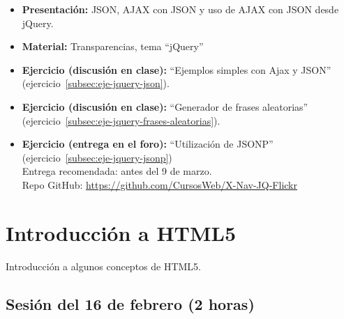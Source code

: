 \documentclass[a4paper,12pt]{report}
\begin{document}
\begin{itemize}
\item \textbf{Presentación:} JSON, AJAX con JSON y uso de AJAX con JSON desde jQuery.
\item \textbf{Material:} Transparencias, tema ``jQuery''
\item \textbf{Ejercicio (discusión en clase):} ``Ejemplos simples con Ajax y JSON'' (ejercicio~\ref{subsec:eje-jquery-json}).
\item \textbf{Ejercicio (discusión en clase):} ``Generador de frases aleatorias'' (ejercicio~\ref{subsec:eje-jquery-frases-aleatorias}).
\item \textbf{Ejercicio (entrega en el foro):} ``Utilización de JSONP'' (ejercicio~\ref{subsec:eje-jquery-jsonp}) \\
  Entrega recomendada: antes del 9 de marzo. \\
  Repo GitHub: \url{https://github.com/CursosWeb/X-Nav-JQ-Flickr}
\end{itemize}


\section{Introducción a HTML5}

Introducción a algunos conceptos de HTML5.

\subsection{Sesión del 16 de febrero (2 horas)}
\end{document}
